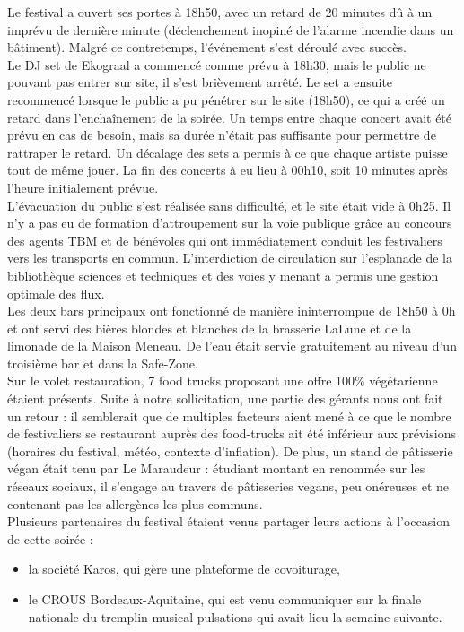 \documentclass[12pt,a4paper]{report}
\begin{document}
Le festival a ouvert ses portes à 18h50, avec un retard de 20 minutes dû à un imprévu de dernière minute (déclenchement inopiné de l'alarme incendie dans un bâtiment). Malgré ce contretemps, l'événement s'est déroulé avec succès.\\

Le DJ set de Ekograal a commencé comme prévu à 18h30, mais le public ne pouvant pas entrer sur site, il s'est brièvement arrêté. Le set a ensuite recommencé lorsque le public a pu pénétrer sur le site (18h50), ce qui a créé un retard dans l'enchaînement de la soirée. Un temps entre chaque concert avait été prévu en cas de besoin, mais sa durée n'était pas suffisante pour permettre de rattraper le retard. Un décalage des sets a permis à ce que chaque artiste puisse tout de même jouer. La fin des concerts à eu lieu à 00h10, soit 10 minutes après l’heure initialement prévue.\\

L'évacuation du public s'est réalisée sans difficulté, et le site était vide à 0h25. Il n'y a pas eu de formation d'attroupement sur la voie publique grâce au concours des agents TBM et de bénévoles qui ont immédiatement conduit les festivaliers vers les transports en commun. L'interdiction de circulation sur l'esplanade de la bibliothèque sciences et techniques et des voies y menant a permis une gestion optimale des flux.\\

Les deux bars principaux ont fonctionné de manière ininterrompue de 18h50 à 0h et ont servi des bières blondes et blanches de la brasserie LaLune et de la limonade de la Maison Meneau. De l’eau était servie gratuitement au niveau d’un troisième bar et dans la Safe-Zone.\\

Sur le volet restauration, 7 food trucks proposant une offre 100\% végétarienne étaient présents. Suite à notre sollicitation, une partie des gérants nous ont fait un retour : il semblerait que de multiples facteurs aient mené à ce que le nombre de festivaliers se restaurant auprès des food-trucks ait été inférieur aux prévisions (horaires du festival, météo, contexte d'inflation). De plus, un stand de pâtisserie végan était tenu par Le Maraudeur : étudiant montant en renommée sur les réseaux sociaux, il s'engage au travers de pâtisseries vegans, peu onéreuses et ne contenant pas les allergènes les plus communs.\\

Plusieurs partenaires du festival étaient venus partager leurs actions à l'occasion de cette soirée : 
\begin{itemize}
\item la société Karos, qui gère une plateforme de covoiturage,
\item le CROUS Bordeaux-Aquitaine, qui est venu communiquer sur la finale nationale du tremplin musical pulsations qui avait lieu la semaine suivante.\\
\end{itemize}
\end{document}
